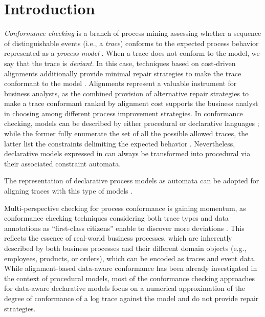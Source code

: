 \section{Introduction}
\label{sec:introduction}

\textit{Conformance checking} is a branch of process mining  assessing whether a sequence of distinguishable events (i.e., a \textit{trace}) conforms to the expected process behavior represented as a \textit{process model} \cite{RozinatA08}. When a trace does not conform to the model, we say that the trace is \textit{deviant}. In this case, techniques based on cost-driven alignments additionally provide minimal repair strategies to make the trace conformant to the model \cite{LeoniA13}. Alignments represent a valuable instrument for business analysts, as the combined provision of alternative repair strategies to make a trace conformant ranked by alignment cost supports the business analyst in choosing among different process improvement strategies. In conformance checking, models can be described by either procedural  or declarative languages  ;  while the former fully enumerate the set of all the possible allowed traces, the latter  list the constraints delimiting the expected behavior \cite{LeoniA13,Westergaard11}. Nevertheless,  declarative models expressed in  can always be transformed into procedural via their associated constraint automata. 

The representation of declarative process models as automata can be adopted for aligning traces with this type of models \cite{LeoniMA12,XuLZ17a}.


Multi-perspective checking for process conformance is gaining momentum, as conformance checking techniques considering both trace types and data annotations as ``first-class citizens'' enable to discover more deviations \cite{MultiPerspective}. This reflects the essence of real-world business processes, which are inherently described by both business processes and their different domain objects \cite{PetermannJMR14} (e.g., employees, products, or orders), which can be encoded as traces and event data. While alignment-based  data-aware conformance has been already investigated in the context of procedural models, most of the conformance checking approaches for data-aware declarative models \cite{BurattinMS16,Borrego014} focus on a numerical approximation of the degree of conformance of a log trace against the model and do not provide repair strategies.

